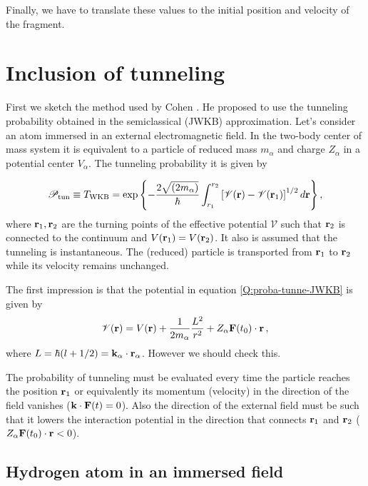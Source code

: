 Finally, we have to translate these values to the initial position and
velocity of the fragment.

\section{Inclusion of tunneling}
\label{S:Inclu-tunne}

First we sketch the method used by Cohen \autocite{Cohen2001PRAp043412}. He proposed
to use the tunneling probability obtained in the semiclassical (JWKB)
approximation. Let's consider an atom immersed in an external
electromagnetic field. In the two-body center of mass system it is
equivalent to a particle of reduced mass $m_{\alpha}$ and charge
$Z_{\alpha}$ in a potential center $V_{\alpha}$. The tunneling
probability it is given by \cite{Galindo1990_QMvII}

\begin{equation}\label{Q:proba-tunne-JWKB}
\mathcal{P}_{\mathrm{tun}} \equiv T_{\mathrm{WKB}} = \exp{\left\{ -
\frac{2 \sqrt{(2 m_{\alpha})}}{\hbar} \int_{r_{1}}^{r_{2}} \left[
\mathcal{V}(\mathbf{r}) - \mathcal{V}(\mathbf{r}_{1})\right]^{1/2} d \mathbf{r}
\right\}} \, ,
\end{equation}
%
where $\mathbf{r}_{1}, \mathbf{r}_{2}$ are the turning points of the effective
potential $\mathcal{V}$ such that $\mathbf{r}_{2}$ is connected to the
continuum and $V(\mathbf{r}_{1})=V(\mathbf{r}_{2})$. It also is assumed that
the tunneling is instantaneous. The (reduced) particle is transported
from $\mathbf{r}_{1}$ to $\mathbf{r}_{2}$ while its velocity remains unchanged.

The first impression is that the potential in equation
\ref{Q:proba-tunne-JWKB} is given by
%
\begin{equation}\label{Q:effec-poten-JWKB}
\mathcal{V}(\mathbf{r}) = V(\mathbf{r}) + \frac{1}{2 m_{\alpha}}
\frac{L^{2}}{r^{2}} + Z_{\alpha} \mathbf{F}(t_{0})  \cdot \mathbf{r} \, ,
\end{equation}
%
where $L=\hbar (l+1/2) = \mathbf{k}_{\alpha} \cdot \mathbf{r}_{\alpha}$.
However we should check this.

The probability of tunneling must be evaluated every time the particle
reaches the position $\mathbf{r}_{1}$ or equivalently its momentum
(velocity) in the direction of the field vanishes ($\mathbf{k} \cdot
\mathbf{F}(t) =0$). Also the direction of the external field must be such
that it lowers the interaction potential in the direction that connects
$\mathbf{r}_{1}$ and $\mathbf{r}_{2}$ ($Z_{\alpha} \mathbf{F}(t_{0})  \cdot \mathbf{r}
< 0$).

\subsection{Hydrogen atom in an immersed field}
\label{S:Hydro-atom-immer-field}

